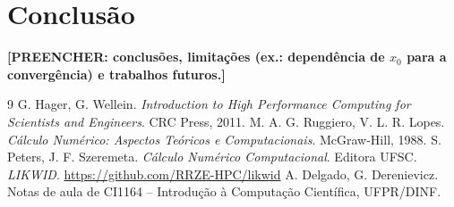 \documentclass[10pt,a4paper]{article}
\newcommand{\preencher}[1]{\textbf{[PREENCHER: #1]}}
\begin{document}
\section{Conclusão}
\preencher{conclusões, limitações (ex.: dependência de $x_0$ para a convergência) e trabalhos futuros.}

\begin{thebibliography}{9}
 G. Hager, G. Wellein. \emph{Introduction to High Performance Computing for Scientists and Engineers}. CRC Press, 2011.
 M. A. G. Ruggiero, V. L. R. Lopes. \emph{Cálculo Numérico: Aspectos Teóricos e Computacionais}. McGraw-Hill, 1988.
 S. Peters, J. F. Szeremeta. \emph{Cálculo Numérico Computacional}. Editora UFSC.
 \emph{LIKWID}. \url{https://github.com/RRZE-HPC/likwid}
 A. Delgado, G. Derenievicz. Notas de aula de CI1164 -- Introdução à Computação Científica, UFPR/DINF.
\end{thebibliography}
\end{document}
